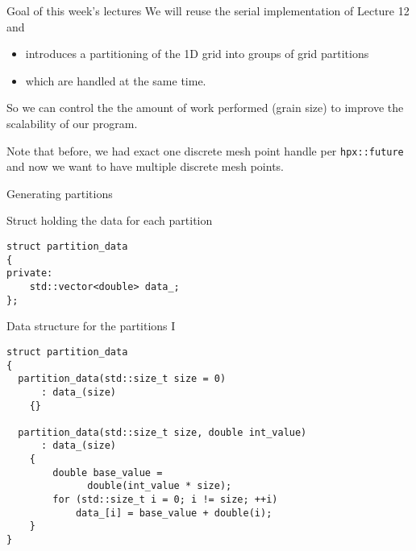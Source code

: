 \documentclass[\classoption]{beamer}
\begin{document}
\begin{frame}{Goal of this week's lectures}
We will reuse the serial implementation of Lecture 12 and

\begin{itemize}
\item introduces a partitioning of the 1D grid into groups of grid partitions
\item which are handled at the same time.
\end{itemize}
So we can control the the amount of work performed (grain size) to improve the scalability of our program. \\
\vspace{0.25cm}

Note that before, we had exact one discrete mesh point handle per \lstinline|hpx::future| and now we want to have multiple discrete mesh points. 
\end{frame}

\begin{frame}[fragile]{Generating partitions}

\begin{center}
\end{center}

\begin{block}{Struct holding the data for each partition}
\begin{lstlisting}
struct partition_data
{
private:
    std::vector<double> data_;
};
\end{lstlisting}
\end{block}

\end{frame}

\begin{frame}[fragile]{Data structure for the partitions I}

\begin{lstlisting}
struct partition_data
{
  partition_data(std::size_t size = 0)
      : data_(size)
    {}

  partition_data(std::size_t size, double int_value)
      : data_(size)
    {
        double base_value = 
              double(int_value * size);
        for (std::size_t i = 0; i != size; ++i)
            data_[i] = base_value + double(i);
    }
}
\end{lstlisting}


\end{frame}
\end{document}
